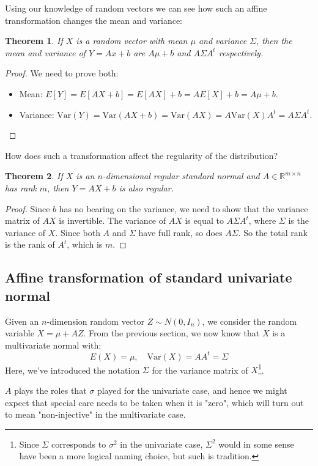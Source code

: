 \documentclass[12pt, a4paper]{article}
\newtheorem{theorem}{Theorem}[section]
\numberwithin{equation}{section}
\begin{document}
Using our knowledge of random vectors we can see how such an affine transformation changes the mean and variance:

\begin{theorem}
If $X$ is a random vector with mean $\mu$ and variance $\Sigma$, then the mean and variance of $Y=Ax+b$ are $A\mu+b$ and $A\Sigma A^t$ respectively.
\end{theorem}
\begin{proof}
We need to prove both:
\begin{itemize}
\item Mean: $E[Y]=E[AX+b]=E[AX]+b=A E[X]+b=A\mu+b$.
\item Variance: $\textrm{Var}(Y)=\textrm{Var}(AX+b)=\textrm{Var}(AX)=A\textrm{Var}(X)A^t=A\Sigma A^t$.
\end{itemize}
\end{proof}

How does such a transformation affect the regularity of the distribution?

\begin{theorem}
If $X$ is an $n$-dimensional regular standard normal and $A\in\mathbb{R}^{m\times n}$ has rank $m$, then $Y=AX+b$ is also regular.
\end{theorem}
\begin{proof}
Since $b$ has no bearing on the variance, we need to show that the variance matrix of $AX$ is invertible. The variance of $AX$ is equal to $A\Sigma A^t$, where $\Sigma$ is the variance of $X$. Since both $A$ and $\Sigma$ have full rank, so does $A\Sigma$. So the total rank is the rank of $A^t$, which is $m$.
\end{proof}

\subsection{Affine transformation of standard univariate normal}
Given an $n$-dimension random vector $Z\sim N(0,I_n)$, we consider the random variable $X=\mu+AZ$. From the previous section, we now know that $X$ is a multivariate normal with:
\begin{equation}
E(X)=\mu,\quad \textrm{Var}(X)=AA^t=\Sigma
\end{equation}
Here, we've introduced the notation $\Sigma$ for the variance matrix of $X$\footnote{Since $\Sigma$ corresponds to $\sigma^2$ in the univariate case, $\Sigma^2$ would in some sense have been a more logical naming choice, but such is tradition.}.

$A$ plays the roles that $\sigma$ played for the univariate case, and hence we might expect that special care needs to be taken when it is "zero", which will turn out to mean "non-injective" in the multivariate case.
\end{document}
